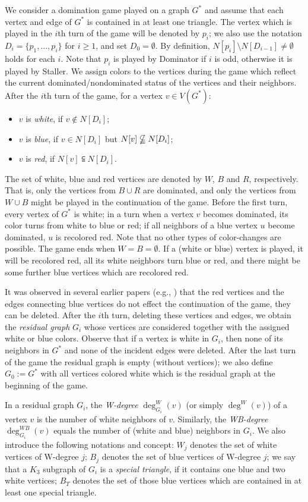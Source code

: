 \documentclass[12pt]{article}
\begin{document}
We consider a domination game played on a graph $G^*$ and assume that each vertex and edge of $G^*$ is contained in at least one triangle. The vertex which is played in the $i$th turn of the game will be denoted by $p_i$; we also use the notation $D_i=\{p_1,\dots, p_i\}$ for $i\ge 1$, and set $D_0=\emptyset$. By definition, $N[p_i]\setminus N[D_{i-1}]\neq \emptyset$ holds for each $i$. Note that $p_i$ is played by Dominator if $i$ is odd, otherwise it is played by Staller. We assign colors to the vertices during the game which reflect the current dominated/nondominated status of the vertices and their neighbors. After the $i$th turn of the game, for a vertex $v\in V(G^*)$:
\begin{itemize}
\item $v$ is \emph{white}, if $v\notin N[D_i]$;
\item $v$ is \emph{blue}, if $v\in N[D_i]$ but $N[v] \nsubseteqq N[D_i]$;
\item $v$ is \emph{red}, if $N[v] \subseteqq N[D_i]$.
\end{itemize}
The set of white, blue and red vertices are denoted by $W$, $B$ and $R$, respectively. That is, only the vertices from $B\cup R$ are dominated, and only the vertices from $W\cup B$ might be played in the continuation of the game. Before the first turn, every vertex of $G^*$ is white; in a turn when a vertex $v$ becomes dominated, its color turns from white to blue or red; if all neighbors of a blue vertex $u$ become dominated, $u$ is recolored red. Note that no other types of color-changes are possible. The game ends when $W=B=\emptyset$. If a (white or blue) vertex is played, it will be recolored red, all its white neighbors turn blue or red, and there might be some further blue vertices which are recolored red.

It was observed in several earlier papers (e.g., \cite{KWZ, B1, S}) that the red vertices and the edges connecting blue vertices do not effect the continuation of the game, they can be deleted. After the $i$th turn, deleting these vertices and edges, we obtain the \emph{residual graph} $G_i$  whose vertices are considered together with the assigned white or blue colors. Observe that if a vertex is white in $G_i$, then none of its neighbors in $G^*$ and none of the incident edges were deleted. After the last turn of the game the residual graph is empty (without vertices); we also define $G_0:=G^*$ with  all vertices colored white which is the residual graph at the beginning of the game.

In a residual graph $G_i$, the \emph{W-degree} $\deg_{G_i}^W(v)$ (or simply $\deg^W(v)$) of a vertex $v$ is the number of white neighbors of $v$. Similarly, the \emph{WB-degree} $\deg_{G_i}^{WB}(v)$ equals the number of (white and blue) neighbors in $G_i$. We also introduce the following notations and concept: $W_j$ denotes the set of white vertices of  W-degree $j$; $B_j$ denotes the set of blue vertices of  W-degree $j$; we say that a $K_3$ subgraph of $G_i$ is a \emph{special triangle}, if it contains one blue and two white vertices; $B_T$ denotes the set of those blue vertices which are contained in at least one special triangle.
\end{document}

